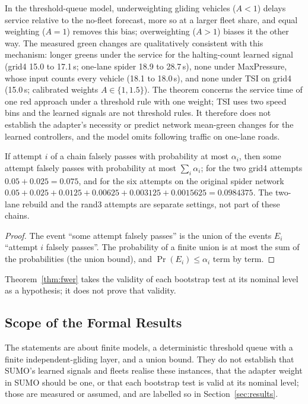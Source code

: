 In the threshold-queue model, underweighting gliding vehicles ($A<1$) delays service relative to the no-fleet forecast, more so at a
larger fleet share, and equal weighting ($A=1$) removes this bias; overweighting ($A>1$) biases it the other way. The measured green
changes are qualitatively consistent with this mechanism: longer greens under the service for the halting-count learned signal (grid4
15.0 to 17.1\,s; one-lane spider 18.9 to 28.7\,s), none under MaxPressure, whose input counts every vehicle (18.1 to 18.0\,s), and none
under TSI on grid4 (15.0\,s; calibrated weights $A\in\{1,1.5\}$). The theorem concerns the service time of one red approach under a
threshold rule with one weight; TSI uses two speed bins and the learned signals are not threshold rules. It therefore does not establish
the adapter's necessity or predict network mean-green changes for the learned controllers, and the model omits following traffic on
one-lane roads.

\begin{theorem}\label{thm:fwer}
If attempt $i$ of a chain falsely passes with probability at most $\alpha_i$, then some attempt falsely passes with probability at most
$\sum_i\alpha_i$; for the two grid4 attempts $0.05+0.025=0.075$, and for the six attempts on the original spider network
$0.05+0.025+0.0125+0.00625+0.003125+0.0015625=0.0984375$. The two-lane rebuild and the rand3 attempts are separate settings, not part of these chains.
\end{theorem}
\begin{proof}
The event ``some attempt falsely passes'' is the union of the events $E_i$ ``attempt $i$ falsely passes''. The probability of a finite
union is at most the sum of the probabilities (the union bound), and $\Pr(E_i)\le\alpha_i$ term by term.
\end{proof}
Theorem~\ref{thm:fwer} takes the validity of each bootstrap test at its nominal level as a hypothesis; it does not prove that validity.

\subsection{Scope of the Formal Results}
The statements are about finite models, a deterministic threshold queue with a finite independent-gliding layer, and a union bound. They
do not establish that SUMO's learned signals and fleets realise these instances, that the adapter weight in SUMO should be one, or that each
bootstrap test is valid at its nominal level; those are measured or assumed, and are labelled so in Section~\ref{sec:results}.


